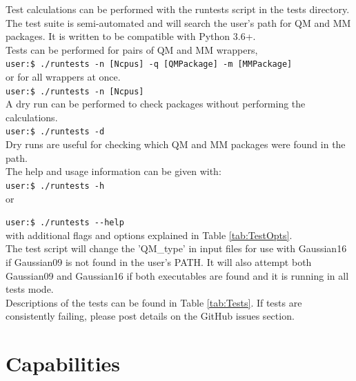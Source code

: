 \documentclass[12pt]{report}
\begin{document}
Test calculations can be performed with the runtests script in the tests
directory.
The test suite is semi-automated and will search the user's path for QM and
MM packages.
It is written to be compatible with Python 3.6+. \\

Tests can be performed for pairs of QM and MM wrappers, \\

\texttt{user:\$ ./runtests -n [Ncpus] -q [QMPackage] -m [MMPackage]} \\

or for all wrappers at once. \\

\texttt{user:\$ ./runtests -n [Ncpus]} \\

A dry run can be performed to check packages without performing the
calculations. \\

\texttt{user:\$ ./runtests -d} \\

Dry runs are useful for checking which QM and MM packages were found in the
path. \\

The help and usage information can be given with: \\

\texttt{user:\$ ./runtests -h} \\

or

\texttt{user:\$ ./runtests -{}-help} \\

with additional flags and options explained in Table \ref{tab:TestOpts}. \\

The test script will change the 'QM_type' in input files for use with
Gaussian16 if Gaussian09 is not found in the user's PATH.
It will also attempt both Gaussian09 and Gaussian16 if both executables are
found and it is running in all tests mode. \\

Descriptions of the tests can be found in Table \ref{tab:Tests}.
If tests are consistently failing, please post details on the GitHub issues
section.

\section{Capabilities}
\end{document}
